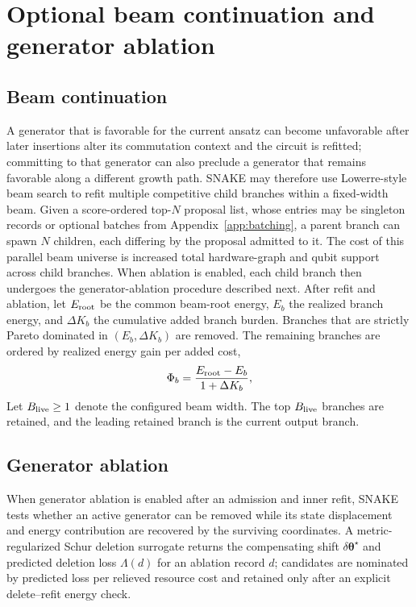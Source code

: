 \documentclass[
  reprint,
  amsmath,
  amssymb,
  aps,
  pra,
  nofootinbib,
  superscriptaddress,
  floatfix
]{revtex4-2}
\begin{document}
\section{Optional beam continuation and generator ablation}
\label{app:optional_structure_management}

\subsection{Beam continuation}
A generator that is favorable for the current ansatz can become unfavorable
after later insertions alter its commutation context and the circuit is
refitted; committing to that generator can also preclude a generator that
remains favorable along a different growth path. \textsc{SNAKE} may therefore use
Lowerre-style beam search \cite{Lowerre1976Beam} to refit multiple competitive
child branches within a fixed-width beam. Given a score-ordered top-$N$
proposal list, whose entries may be singleton records or optional batches from
Appendix~\ref{app:batching}, a parent branch can spawn $N$ children, each
differing by the proposal admitted to it. The cost of this parallel beam
universe is increased total hardware-graph and qubit support across child
branches. When ablation is enabled, each child branch then undergoes the
generator-ablation procedure described next. After refit and ablation, let
\(E_{\rm root}\) be the common beam-root energy, \(E_b\) the realized branch
energy, and \(\Delta K_b\) the cumulative added branch burden. Branches that are
strictly Pareto dominated in \((E_b,\Delta K_b)\) are removed. The remaining
branches are ordered by realized energy gain per added cost,
\begin{equation*}
\Phi_b=\frac{E_{\rm root}-E_b}{1+\Delta K_b},
\end{equation*}
Let \(B_{\rm live}\ge1\) denote the configured beam width. The top
\(B_{\rm live}\) branches are retained, and the leading retained branch is
the current output branch.


\subsection{Generator ablation}
%
When generator ablation is enabled after an admission and inner refit,
\textsc{SNAKE} tests whether an active
generator can be removed while its state displacement and energy contribution
are recovered by the surviving coordinates. A metric-regularized Schur
deletion surrogate returns the compensating shift
\(\delta\boldsymbol\theta^\star\) and predicted deletion loss
\(\Lambda(d)\) for an ablation record \(d\); candidates are nominated by predicted loss per relieved
resource cost and retained only after an explicit delete--refit energy check.
\end{document}

